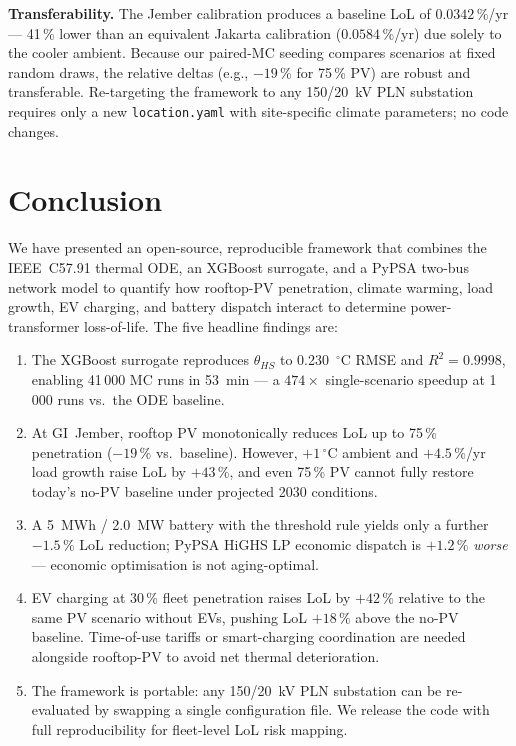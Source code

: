 \documentclass[conference]{IEEEtran}
\begin{document}
\textbf{Transferability.} The Jember calibration produces a baseline LoL of $0.0342\,\%$/yr --- 41\,\% lower than an equivalent Jakarta calibration ($0.0584\,\%$/yr) due solely to the cooler ambient. Because our paired-MC seeding compares scenarios at fixed random draws, the relative deltas (e.g., $-19\,\%$ for 75\,\% PV) are robust and transferable. Re-targeting the framework to any 150/20~kV PLN substation requires only a new \texttt{location.yaml} with site-specific climate parameters; no code changes.

\section{Conclusion}
\label{sec:conclusion}

We have presented an open-source, reproducible framework that combines the IEEE~C57.91 thermal ODE, an XGBoost surrogate, and a PyPSA two-bus network model to quantify how rooftop-PV penetration, climate warming, load growth, EV charging, and battery dispatch interact to determine power-transformer loss-of-life. The five headline findings are:

\begin{enumerate}
    \item The XGBoost surrogate reproduces $\theta_{HS}$ to 0.230~$^\circ$C RMSE and $R^2 = 0.9998$, enabling 41\,000 MC runs in 53~min --- a $474\times$ single-scenario speedup at 1\,000 runs vs.\ the ODE baseline.
    \item At GI~Jember, rooftop PV monotonically reduces LoL up to 75\,\% penetration ($-19\,\%$ vs.\ baseline). However, $+1\,^\circ$C ambient and $+4.5\,\%$/yr load growth raise LoL by $+43\,\%$, and even 75\,\% PV cannot fully restore today's no-PV baseline under projected 2030 conditions.
    \item A 5~MWh / 2.0~MW battery with the threshold rule yields only a further $-1.5\,\%$ LoL reduction; PyPSA HiGHS LP economic dispatch is $+1.2\,\%$ \emph{worse} --- economic optimisation is not aging-optimal.
    \item EV charging at 30\,\% fleet penetration raises LoL by $+42\,\%$ relative to the same PV scenario without EVs, pushing LoL $+18\,\%$ above the no-PV baseline. Time-of-use tariffs or smart-charging coordination are needed alongside rooftop-PV to avoid net thermal deterioration.
    \item The framework is portable: any 150/20~kV PLN substation can be re-evaluated by swapping a single configuration file. We release the code with full reproducibility for fleet-level LoL risk mapping.
\end{enumerate}
\end{document}
